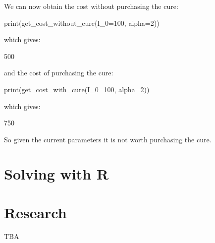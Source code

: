 We can now obtain the cost without purchasing the cure:

\begin{pyin}
print(get_cost_without_cure(I_0=100, alpha=2))
\end{pyin}

which gives:

\begin{pyout}
500
\end{pyout}

and the cost of purchasing the cure:

\begin{pyin}
print(get_cost_with_cure(I_0=100, alpha=2))
\end{pyin}

which gives:

\begin{pyout}
750
\end{pyout}

So given the current parameters it is not worth purchasing the cure.

\section{Solving with R}\label{sec:solving-with-R}


\section{Research}\label{sec:research}

TBA
